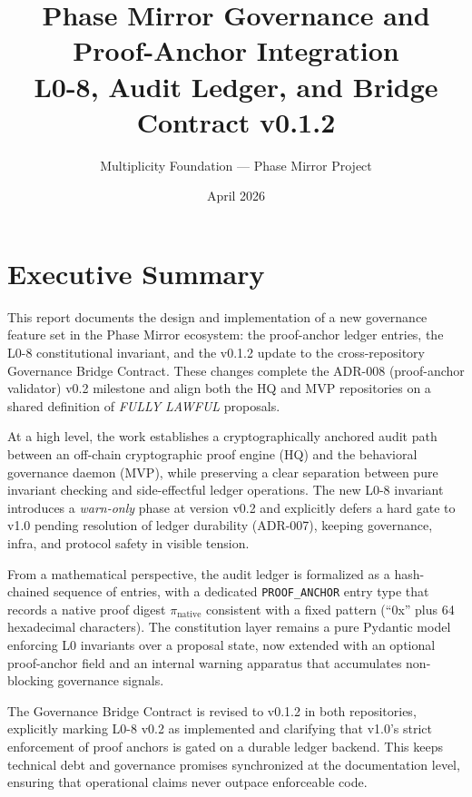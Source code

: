 \documentclass[11pt]{article}
\title{Phase Mirror Governance and Proof-Anchor Integration\\[0.25em]
\large L0-8, Audit Ledger, and Bridge Contract v0.1.2}
\author{Multiplicity Foundation --- Phase Mirror Project}
\date{April 2026}
\begin{document}
\maketitle

\tableofcontents

\newpage


\section{Executive Summary}

This report documents the design and implementation of a new governance feature set in the Phase Mirror ecosystem: the proof-anchor ledger entries, the L0-8 constitutional invariant, and the v0.1.2 update to the cross-repository Governance Bridge Contract.\cite{cite:41,cite:46,cite:47} These changes complete the ADR-008 (proof-anchor validator) v0.2 milestone and align both the HQ and MVP repositories on a shared definition of \emph{FULLY LAWFUL} proposals.\cite{cite:41,cite:46,cite:47}

At a high level, the work establishes a cryptographically anchored audit path between an off-chain cryptographic proof engine (HQ) and the behavioral governance daemon (MVP), while preserving a clear separation between pure invariant checking and side-effectful ledger operations.\cite{cite:41,cite:46,cite:47} The new L0-8 invariant introduces a \emph{warn-only} phase at version v0.2 and explicitly defers a hard gate to v1.0 pending resolution of ledger durability (ADR-007), keeping governance, infra, and protocol safety in visible tension.\cite{cite:41,cite:42,cite:46,cite:47}

From a mathematical perspective, the audit ledger is formalized as a hash-chained sequence of entries, with a dedicated \texttt{PROOF\_ANCHOR} entry type that records a native proof digest \(\pi_{\mathrm{native}}\) consistent with a fixed pattern (``0x'' plus 64 hexadecimal characters).\cite{cite:41} The constitution layer remains a pure Pydantic model enforcing L0 invariants over a proposal state, now extended with an optional proof-anchor field and an internal warning apparatus that accumulates non-blocking governance signals.\cite{cite:40,cite:41,cite:42}

The Governance Bridge Contract is revised to v0.1.2 in both repositories, explicitly marking L0-8 v0.2 as implemented and clarifying that v1.0's strict enforcement of proof anchors is gated on a durable ledger backend.\cite{cite:44,cite:46,cite:47} This keeps technical debt and governance promises synchronized at the documentation level, ensuring that operational claims never outpace enforceable code.
\end{document}
